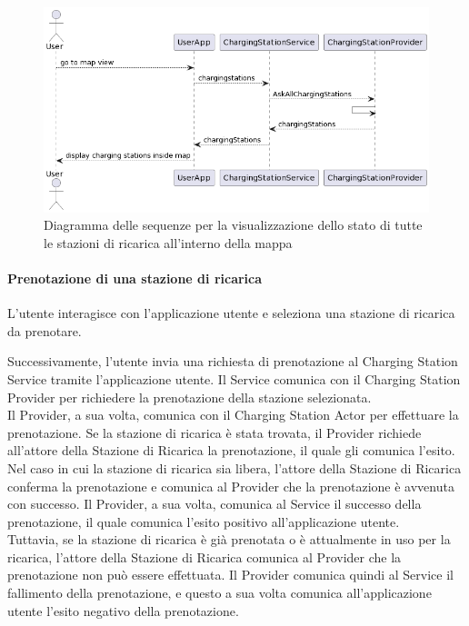 \begin{figure}[htbp]
    \centering
    \includegraphics[width=\textwidth]{images/ask-all-stations.png}
    \caption{Diagramma delle sequenze per la visualizzazione dello stato di tutte le stazioni
        di ricarica all'interno della mappa}
    \label{fig:ask-all-stations}
\end{figure}

\paragraph{Prenotazione di una stazione di ricarica}
L'utente interagisce con l'applicazione utente e seleziona una stazione di ricarica da prenotare.

Successivamente, l'utente invia una richiesta di prenotazione al Charging Station Service
tramite l'applicazione utente. Il Service comunica con il Charging Station Provider per
richiedere la prenotazione della stazione selezionata.\\

Il Provider, a sua volta, comunica con il Charging Station Actor per effettuare la prenotazione.
Se la stazione di ricarica è stata trovata, il Provider richiede all'attore della Stazione di
Ricarica la prenotazione, il quale gli comunica l'esito.\\

Nel caso in cui la stazione di ricarica sia libera, l'attore della Stazione di Ricarica conferma
la prenotazione e comunica al Provider che la prenotazione è avvenuta con successo. Il Provider,
a sua volta, comunica al Service il successo della prenotazione, il quale comunica l'esito
positivo all'applicazione utente.\\

Tuttavia, se la stazione di ricarica è già prenotata o è attualmente in uso per la ricarica,
l'attore della Stazione di Ricarica comunica al Provider che la prenotazione non può essere effettuata.
Il Provider comunica quindi al Service il fallimento della prenotazione, e questo a sua volta
comunica all'applicazione utente l'esito negativo della prenotazione.\\

